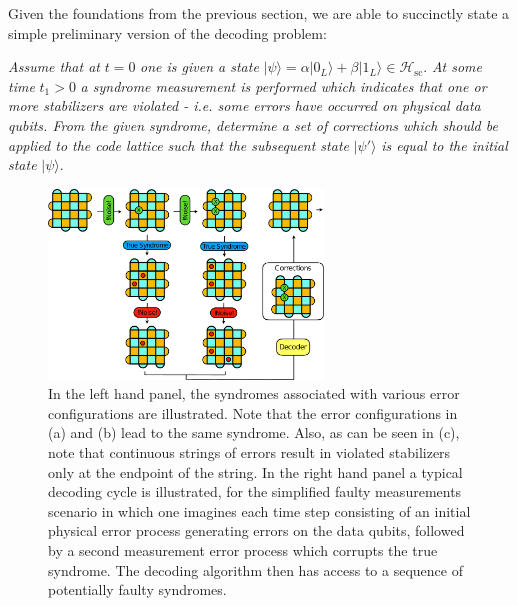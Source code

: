 \documentclass[twocolumn,preprintnumbers,amsmath,amssymb,notitlepage,nofootinbib,longbibliography,superscriptaddress,aps,pra,10pt]{revtex4-1}
\begin{document}
    Given the foundations from the previous section, we are able to succinctly state a simple preliminary version of the decoding problem:\newline

    \noindent\textit{Assume that at} $t=0$  \textit{one is given a state} $|\psi\rangle = \alpha |0_L\rangle + \beta |1_L\rangle \in \mathcal{H}_{\mathrm{sc}}.$ \textit{At some time }$t_1>0$ \textit{a syndrome measurement is performed which indicates that one or more stabilizers are violated - i.e. some errors have occurred on physical data qubits. From the given syndrome, determine a set of corrections which should be applied to the code lattice such that the subsequent state} $|\psi'\rangle$ \textit{is equal to the initial state} $|\psi\rangle.$ \newline

    \begin{figure}
      \centering
      \includegraphics[width=0.65\textwidth]{decoding_problem.pdf}
      \caption{In the left hand panel, the syndromes associated with various error configurations are illustrated. Note that the error configurations in (a) and (b) lead to the same syndrome. Also, as can be seen in (c), note that continuous strings of errors result in violated stabilizers only at the endpoint of the string. In the right hand panel a typical decoding cycle is illustrated, for the simplified faulty measurements scenario in which one imagines each time step consisting of an initial physical error process generating errors on the data qubits, followed by a second measurement error process which corrupts the true syndrome. The decoding algorithm then has access to a sequence of potentially faulty syndromes.}\label{f:decoding_problem}
    \end{figure}
\end{document}
